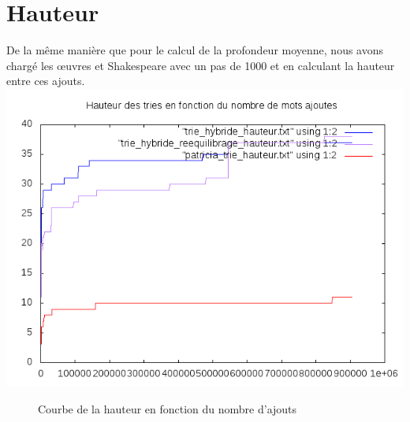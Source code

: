 \documentclass[a4paper,12pt]{report}
\begin{document}
\section{Hauteur}
De la même manière que pour le calcul de la profondeur moyenne, nous avons chargé les œuvres et Shakespeare avec un pas de 1000
et en calculant la hauteur entre ces ajouts.\\
\includegraphics{../comparaison/courbe_hauteur.png}
\begin{figure}[!htbp]
\caption{Courbe de la hauteur en fonction du nombre d'ajouts}
\end{figure}
\end{document}
